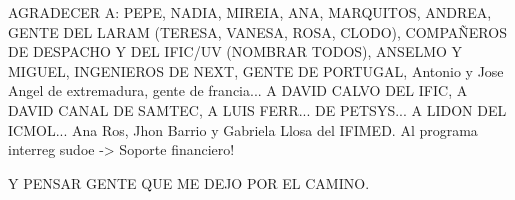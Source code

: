 AGRADECER A: PEPE, NADIA, MIREIA, ANA, MARQUITOS, ANDREA, GENTE DEL LARAM (TERESA, VANESA, ROSA, CLODO), COMPAÑEROS DE DESPACHO Y DEL IFIC/UV (NOMBRAR TODOS), ANSELMO Y MIGUEL, INGENIEROS DE NEXT, GENTE DE PORTUGAL, Antonio y Jose Angel de extremadura, gente de francia...  A DAVID CALVO DEL IFIC, A DAVID CANAL DE SAMTEC, A LUIS FERR... DE PETSYS... A LIDON DEL ICMOL... Ana Ros, Jhon Barrio y Gabriela Llosa del IFIMED. Al programa interreg sudoe -> Soporte financiero!


Y PENSAR GENTE QUE ME DEJO POR EL CAMINO.

